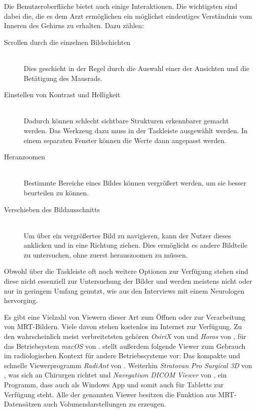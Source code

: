 Die Benutzeroberfläche bietet auch einige Interaktionen. Die wichtigsten sind dabei die, die es dem Arzt ermöglichen ein möglichst eindeutiges Verständnis vom Inneren des Gehirns zu erhalten.  Dazu zählen:

\begin{description}
\item [Scrollen durch die einzelnen Bildschichten]\hfill \\
Dies geschieht in der Regel durch die Auswahl einer der Ansichten und die Betätigung des Mausrads. 
\item [Einstellen von Kontrast und Helligkeit]\hfill \\
Dadurch können schlecht sichtbare Strukturen erkennbarer gemacht werden. Das Werkzeug dazu muss in der Taskleiste ausgewählt werden. In einem separaten Fenster können die Werte dann angepasst werden. 
\item [Heranzoomen]\hfill \\
Bestimmte Bereiche eines Bildes können vergrößert werden, um sie besser beurteilen zu können.
\item [Verschieben des Bildausschnitts]\hfill \\
Um über ein vergrößertes Bild zu navigieren, kann der Nutzer dieses anklicken und in eine Richtung ziehen. Dies ermöglicht es andere Bildteile zu untersuchen, ohne zuerst herauszoomen zu müssen.
\end{description}

Obwohl über die Taskleiste oft noch weitere Optionen zur Verfügung stehen sind diese nicht essenziell zur Untersuchung der Bilder und werden meistens nicht oder nur in geringem Umfang genutzt, wie aus den Interviews mit einem Neurologen hervorging.

Es gibt eine Vielzahl von Viewern dieser Art zum Öffnen oder zur Verarbeitung von MRT-Bildern. Viele davon stehen kostenlos im Internet zur Verfügung. 
Zu den wahrscheinlich meist verbreitetsten gehören \textit{OsiriX} von \cite{osirix} und \textit{Horos} von \cite{horos}, für das Betriebsystem \textit{macOS} von \cite{macOs}. \cite{radiocafe} stellt außerdem folgende Viewer zum Gebrauch im radiologischen Kontext für andere Betriebssysteme vor: Das kompakte und schnelle Viewerprogramm \textit{RadiAnt} von \cite{radiant}. Weiterhin \textit{Stratovan Pro Surgical 3D} von \cite{prosurgical}, was sich an Chirurgen richtet und \textit{Navegatium DICOM Viewer} von \cite{navegatium}, ein Programm, dass auch als Windows App und somit auch für Tabletts zur Verfügung steht.
Alle der genannten Viewer besitzen die Funktion aus MRT-Datensätzen auch Volumendarstellungen zu erzeugen.

